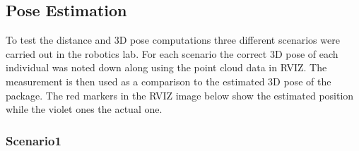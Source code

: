 \subsection{Pose Estimation}

To test the distance and 3D pose computations three different scenarios were carried out in the robotics lab. For each scenario the correct 3D pose of each individual was noted down along using the point cloud data in RVIZ. The measurement is then used as a comparison to the estimated 3D pose of the package. The red markers in the RVIZ image below show the estimated position while the violet ones the actual one.

\subsubsection{Scenario1}

